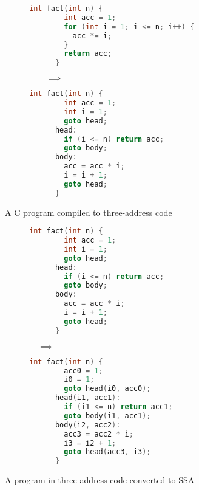 \documentclass[acmsmall,screen,review]{acmart}
\begin{document}
\begin{figure}
  \begin{subfigure}{0.4\textwidth}
    \begin{lstlisting}[language=C]
      int fact(int n) {
        int acc = 1;
        for (int i = 1; i <= n; i++) {
          acc *= i;
        }
        return acc;
      }
    \end{lstlisting}
    \vspace{2.5em}
  \end{subfigure}%
  \begin{subfigure}{0.2\textwidth}
    $\hspace{2em} \implies \hspace{2em}$
    \vspace{7em}
  \end{subfigure}%
  \begin{subfigure}{0.35\textwidth}
    \begin{lstlisting}[language=C]
      int fact(int n) {
        int acc = 1;
        int i = 1;
        goto head;
      head:
        if (i <= n) return acc;
        goto body;
      body:
        acc = acc * i;
        i = i + 1;
        goto head;
      }
    \end{lstlisting}
  \end{subfigure}
  \caption{A C program compiled to three-address code}
\end{figure}

\begin{figure}
  \begin{subfigure}{0.4\textwidth}
    \begin{lstlisting}[language=C]
      int fact(int n) {
        int acc = 1;
        int i = 1;
        goto head;
      head:
        if (i <= n) return acc;
        goto body;
      body:
        acc = acc * i;
        i = i + 1;
        goto head;
      }
    \end{lstlisting}
  \end{subfigure}%
  \begin{subfigure}{0.2\textwidth}
    $\hspace{1em} \implies \hspace{2em}$
    \vspace{7em}
  \end{subfigure}%
  \begin{subfigure}{0.35\textwidth}
    \begin{lstlisting}[language=C]
      int fact(int n) {
        acc0 = 1;
        i0 = 1;
        goto head(i0, acc0);
      head(i1, acc1):
        if (i1 <= n) return acc1;
        goto body(i1, acc1);
      body(i2, acc2):
        acc3 = acc2 * i;
        i3 = i2 + 1;
        goto head(acc3, i3);
      }
    \end{lstlisting}
  \end{subfigure}
  \caption{A program in three-address code converted to SSA}
\end{figure}
\end{document}
